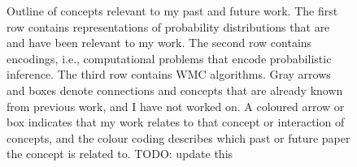 \begin{figure}[t]
  \caption{Outline of concepts relevant to my past and future work. The first
    row contains representations of probability distributions that are and have
    been relevant to my work. The second row contains encodings, i.e.,
    computational problems that encode probabilistic inference. The third row
    contains WMC algorithms. Gray arrows and boxes denote connections and
    concepts that are already known from previous work, and I have not worked
    on. A coloured arrow or box indicates that my work relates to that concept
    or interaction of concepts, and the colour coding describes which past or
    future paper the concept is related to. TODO: update this}
  \label{fig:overview}
\end{figure}

